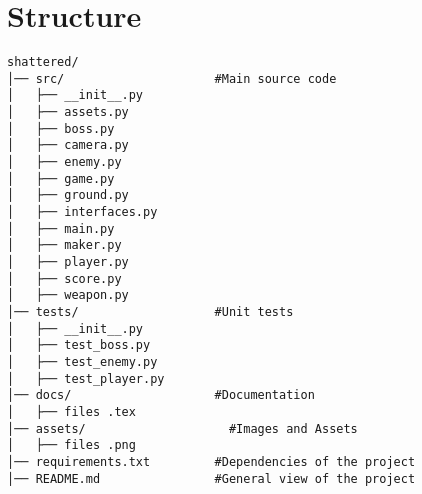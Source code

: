 \newpage
\section{Structure}

\begin{verbatim}
shattered/
│── src/                     #Main source code
│   ├── __init__.py          
│   ├── assets.py            
│   ├── boss.py 
│   ├── camera.py 
│   ├── enemy.py 
│   ├── game.py 
│   ├── ground.py 
│   ├── interfaces.py 
│   ├── main.py 
│   ├── maker.py 
│   ├── player.py 
│   ├── score.py  
│   ├── weapon.py 
│── tests/                   #Unit tests
│   ├── __init__.py 
│   ├── test_boss.py 
│   ├── test_enemy.py 
│   ├── test_player.py 
│── docs/                    #Documentation
│   ├── files .tex
│── assets/                    #Images and Assets
│   ├── files .png                               
│── requirements.txt         #Dependencies of the project
│── README.md                #General view of the project

\end{verbatim}

